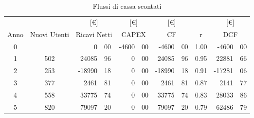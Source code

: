 \begin{table}[!h]
\centering
\begin{tabular}{c|c|r@{.}l|r@{.}l|r@{.}l|c|r@{.}l}
& 
& \multicolumn{2}{|c}{[\euro]}
& \multicolumn{2}{|c}{[\euro]}
& \multicolumn{2}{|c|}{[\euro]}
& 
& \multicolumn{2}{|c}{[\euro]}
\\
Anno
& Nuovi Utenti
& \multicolumn{2}{|c}{Ricavi Netti}
& \multicolumn{2}{|c}{CAPEX}
& \multicolumn{2}{|c|}{CF}
& r
& \multicolumn{2}{|c}{DCF}
\\

\hline
0 &      &      0&00 & -4600&00&  -4600&00 &1.00& -4600&00 \\
1 & 502  &  24085&96 &     0&00&  24085&96 &0.95& 22881&66 \\ 
2 & 253  & -18990&18 &     0&00& -18990&18 &0.91&-17281&06 \\
3 & 377  &   2461&81 &     0&00&   2461&81 &0.87&  2141&77 \\
4 & 558  &  33775&74 &     0&00&  33775&74 &0.83& 28033&86 \\
5 & 820  &  79097&20 &     0&00&  79097&20 &0.79& 62486&79
\end{tabular}
\caption{Flussi di cassa scontati}
\label{tab:dcf}
\end{table}
